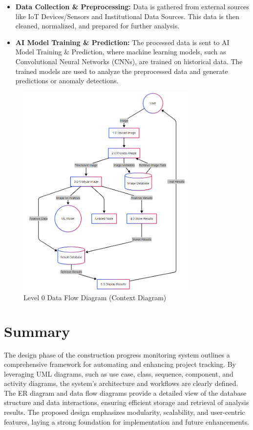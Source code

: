 \documentclass[12pt,a4paper]{report}
\begin{document}
\begin{itemize}
    \item \textbf{Data Collection \& Preprocessing:} Data is gathered from external sources like IoT Devices/Sensors and Institutional Data Sources. This data is then cleaned, normalized, and prepared for further analysis.
    \item \textbf{AI Model Training \& Prediction:} The processed data is sent to AI Model Training \& Prediction, where machine learning models, such as Convolutional Neural Networks (CNNs), are trained on historical data. The trained models are used to analyze the preprocessed data and generate predictions or anomaly detections.
\end{itemize}
\begin{figure}[H]
    \centering
    \includegraphics[width=0.8\textwidth]{images/level 1.png} %
    \caption{Level 0 Data Flow Diagram (Context Diagram)}
    \label{fig:level-2-dfd}
\end{figure}
\section{Summary}
The design phase of the construction progress monitoring system outlines a comprehensive framework for automating and enhancing project tracking. By leveraging UML diagrams, such as use case, class, sequence, component, and activity diagrams, the system's architecture and workflows are clearly defined. The ER diagram and data flow diagrams provide a detailed view of the database structure and data interactions, ensuring efficient storage and retrieval of analysis results. The proposed design emphasizes modularity, scalability, and user-centric features, laying a strong foundation for implementation and future enhancements.
\end{document}
